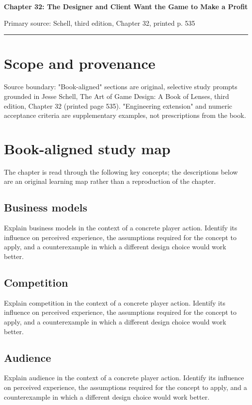 \documentclass[11pt]{article}
\begin{document}
{\huge\bfseries\color{suiteblue} Chapter 32: The Designer and Client Want the Game to Make a Profit}\par
\vspace{0.15in}
{\normalsize\color{suitegray} Primary source: Schell, third edition, Chapter 32, printed p. 535}\par
\vspace{0.15in}\hrule\vspace{0.15in}

\section{Scope and provenance}
Source boundary: "Book-aligned" sections are original, selective study prompts grounded in Jesse Schell, The Art of Game Design: A Book of Lenses, third edition, Chapter 32 (printed page 535). "Engineering extension" and numeric acceptance criteria are supplementary examples, not prescriptions from the book.


\section{Book-aligned study map}
The chapter is read through the following key concepts; the descriptions below are an original learning map rather than a reproduction of the chapter.


\subsection{Business models}
Explain business models in the context of a concrete player action. Identify its influence on perceived experience, the assumptions required for the concept to apply, and a counterexample in which a different design choice would work better.


\subsection{Competition}
Explain competition in the context of a concrete player action. Identify its influence on perceived experience, the assumptions required for the concept to apply, and a counterexample in which a different design choice would work better.


\subsection{Audience}
Explain audience in the context of a concrete player action. Identify its influence on perceived experience, the assumptions required for the concept to apply, and a counterexample in which a different design choice would work better.
\end{document}
